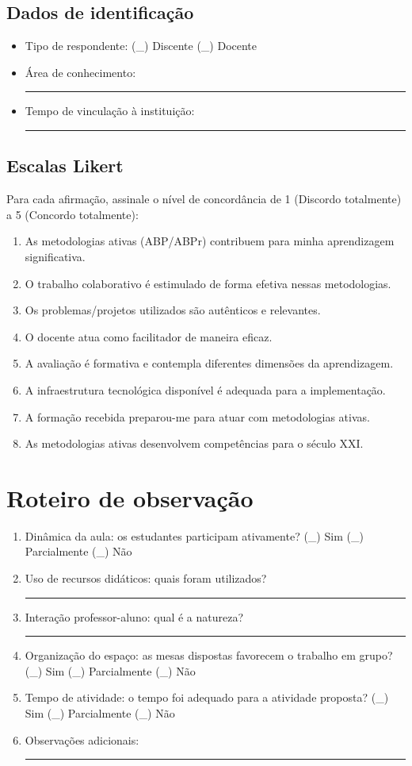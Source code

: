 \documentclass[12pt,a4paper,twoside,openright]{book}
\begin{document}
\subsection{Dados de identificação}
\begin{itemize}
    \item Tipo de respondente: (\_) Discente (\_) Docente
    \item Área de conhecimento: \rule{5cm}{0.15mm}
    \item Tempo de vinculação à instituição: \rule{3cm}{0.15mm}
\end{itemize}

\subsection{Escalas Likert}
Para cada afirmação, assinale o nível de concordância de 1 (Discordo totalmente) a 5 (Concordo totalmente):

\begin{enumerate}
    \item As metodologias ativas (ABP/ABPr) contribuem para minha aprendizagem significativa.
    \item O trabalho colaborativo é estimulado de forma efetiva nessas metodologias.
    \item Os problemas/projetos utilizados são autênticos e relevantes.
    \item O docente atua como facilitador de maneira eficaz.
    \item A avaliação é formativa e contempla diferentes dimensões da aprendizagem.
    \item A infraestrutura tecnológica disponível é adequada para a implementação.
    \item A formação recebida preparou-me para atuar com metodologias ativas.
    \item As metodologias ativas desenvolvem competências para o século XXI.
\end{enumerate}

\section{Roteiro de observação}
\label{sec:roteiro_observacao}

\begin{enumerate}
    \item Dinâmica da aula: os estudantes participam ativamente? (\_) Sim (\_) Parcialmente (\_) Não
    \item Uso de recursos didáticos: quais foram utilizados? \rule{5cm}{0.15mm}
    \item Interação professor-aluno: qual é a natureza? \rule{5cm}{0.15mm}
    \item Organização do espaço: as mesas dispostas favorecem o trabalho em grupo? (\_) Sim (\_) Parcialmente (\_) Não
    \item Tempo de atividade: o tempo foi adequado para a atividade proposta? (\_) Sim (\_) Parcialmente (\_) Não
    \item Observações adicionais: \rule{8cm}{0.15mm}
\end{enumerate}
\end{document}
